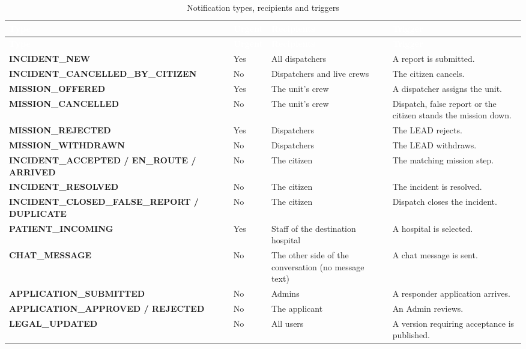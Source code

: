 {\tabfont\rowband
\begin{longtable}{@{}>{\raggedright\arraybackslash}p{}>{\raggedright\arraybackslash}p{}>{\raggedright\arraybackslash}p{}>{\raggedright\arraybackslash}p{}@{}}
\caption{Notification types, recipients and triggers}\label{tab:notifications}\\
\rowcolor{najdanavy}\textcolor{white}{\sffamily\bfseries\small Type} & \textcolor{white}{\sffamily\bfseries\small Urgent} & \textcolor{white}{\sffamily\bfseries\small Recipients} & \textcolor{white}{\sffamily\bfseries\small Trigger}\\
\endfirsthead
\rowcolor{najdanavy}\textcolor{white}{\sffamily\bfseries\small Type} & \textcolor{white}{\sffamily\bfseries\small Urgent} & \textcolor{white}{\sffamily\bfseries\small Recipients} & \textcolor{white}{\sffamily\bfseries\small Trigger}\\
\endhead
\bottomrule\endlastfoot
\textbf{INCIDENT\_\allowbreak{}NEW} & Yes & All dispatchers & A report is submitted.\\
\textbf{INCIDENT\_\allowbreak{}CANCELLED\_\allowbreak{}BY\_\allowbreak{}CITIZEN} & No & Dispatchers and live crews & The citizen cancels.\\
\textbf{MISSION\_\allowbreak{}OFFERED} & Yes & The unit’s crew & A dispatcher assigns the unit.\\
\textbf{MISSION\_\allowbreak{}CANCELLED} & No & The unit’s crew & Dispatch, false report or the citizen stands the mission down.\\
\textbf{MISSION\_\allowbreak{}REJECTED} & Yes & Dispatchers & The LEAD rejects.\\
\textbf{MISSION\_\allowbreak{}WITHDRAWN} & No & Dispatchers & The LEAD withdraws.\\
\textbf{INCIDENT\_\allowbreak{}ACCEPTED /\allowbreak{} EN\_\allowbreak{}ROUTE /\allowbreak{} ARRIVED} & No & The citizen & The matching mission step.\\
\textbf{INCIDENT\_\allowbreak{}RESOLVED} & No & The citizen & The incident is resolved.\\
\textbf{INCIDENT\_\allowbreak{}CLOSED\_\allowbreak{}FALSE\_\allowbreak{}REPORT /\allowbreak{} DUPLICATE} & No & The citizen & Dispatch closes the incident.\\
\textbf{PATIENT\_\allowbreak{}INCOMING} & Yes & Staff of the destination hospital & A hospital is selected.\\
\textbf{CHAT\_\allowbreak{}MESSAGE} & No & The other side of the conversation (no message text) & A chat message is sent.\\
\textbf{APPLICATION\_\allowbreak{}SUBMITTED} & No & Admins & A responder application arrives.\\
\textbf{APPLICATION\_\allowbreak{}APPROVED /\allowbreak{} REJECTED} & No & The applicant & An Admin reviews.\\
\textbf{LEGAL\_\allowbreak{}UPDATED} & No & All users & A version requiring acceptance is published.\\
\end{longtable}}
